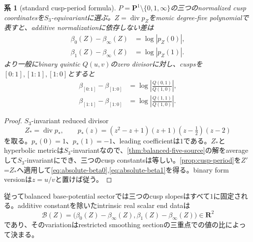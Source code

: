 \documentclass[11pt,a4paper]{ltjsarticle}
\newtheorem{corollary}[theorem]{系}
\theoremstyle{definition}
\theoremstyle{remark}
\newcommand{\PP}{\mathbf P}
\newcommand{\RR}{\mathbf R}
\begin{document}
\begin{corollary}[standard cusp-period formula]\label{cor:absolute-cusp-period}
$P=\PP^1\setminus\{0,1,\infty\}$の三つのnormalized cusp coordinatesを$S_3$-equivariantに選ぶ。$Z=\operatorname{div}p_Z$をmonic degree-five polynomialで表すと、additive normalizationに依存しない差は
\begin{align}
 \beta_0(Z)-\beta_\infty(Z)&=\log|p_Z(0)|,\label{eq:absolute-beta0}\\
 \beta_1(Z)-\beta_\infty(Z)&=\log|p_Z(1)|.
 \label{eq:absolute-beta1}
\end{align}
より一般にbinary quintic $Q(u,v)$のzero divisorに対し、cuspsを$[0:1],[1:1],[1:0]$とすると
\begin{align}
 \beta_{[0:1]}-\beta_{[1:0]}&=
 \log\left|\frac{Q(0,1)}{Q(1,0)}\right|,\label{eq:binary-beta0}\\
 \beta_{[1:1]}-\beta_{[1:0]}&=
 \log\left|\frac{Q(1,1)}{Q(1,0)}\right|.
 \label{eq:binary-beta1}
\end{align}
\end{corollary}

\begin{proof}
$S_3$-invariant reduced divisor
\[
 Z_*=\operatorname{div}p_*,\qquad
 p_*(z)=(z^2-z+1)(z+1)(z-\tfrac12)(z-2)
\]
を取る。$p_*(0)=1$、$p_*(1)=-1$、leading coefficientは$1$である。$Z_*$とhyperbolic metricは$S_3$-invariantなので、\cref{thm:balanced-five-source}の解をaverageして$S_3$-invariantにでき、三つのcusp constantsは等しい。\cref{prop:cusp-period}を$Z'$=$Z_*$へ適用して\eqref{eq:absolute-beta0},\eqref{eq:absolute-beta1}を得る。binary form versionは$z=u/v$と置けば従う。
\end{proof}

従ってbalanced base-potential sectorでは三つのcusp slopesはすべて$1$に固定される。additive constantを除いたintrinsic real scalar end dataは
\begin{equation}\label{eq:boundary-period-map}
 \mathcal B(Z)
 =\bigl(\beta_0(Z)-\beta_\infty(Z),
        \beta_1(Z)-\beta_\infty(Z)\bigr)\in\RR^2
\end{equation}
であり、そのvariationはrestricted smoothing sectionの三重点での値の比によって決まる。
\end{document}
